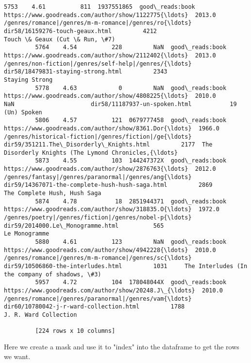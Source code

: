 \documentclass[11pt]{article}
\begin{document}
\begin{Verbatim}[commandchars=\\\{\}]
         5753    4.61          811  1937551865  good\_reads:book  https://www.goodreads.com/author/show/1122775{\ldots}  2013.0  /genres/romance|/genres/m-m-romance|/genres/ro{\ldots}                    dir58/16159276-touch-geaux.html         4212                      Touch \& Geaux (Cut \& Run, \#7)
         5764    4.54          228         NaN  good\_reads:book  https://www.goodreads.com/author/show/2112402{\ldots}  2013.0  /genres/non-fiction|/genres/self-help|/genres/{\ldots}                 dir58/18479831-staying-strong.html         2343                                     Staying Strong
         5778    4.63            0         NaN  good\_reads:book  https://www.goodreads.com/author/show/4808225{\ldots}  2010.0                                                NaN                      dir58/11187937-un-spoken.html           19                                        (Un) Spoken
         5806    4.57          121  0679777458  good\_reads:book  https://www.goodreads.com/author/show/8361.Dor{\ldots}  1966.0  /genres/historical-fiction|/genres/fiction|/ge{\ldots}           dir59/351211.The\_Disorderly\_Knights.html         2177  The Disorderly Knights (The Lymond Chronicles,{\ldots}
         5873    4.55          103  144247372X  good\_reads:book  https://www.goodreads.com/author/show/2876763{\ldots}  2012.0  /genres/fantasy|/genres/paranormal|/genres/ang{\ldots}    dir59/14367071-the-complete-hush-hush-saga.html         2869                       The Complete Hush, Hush Saga
         5874    4.78           18  2851944371  good\_reads:book  https://www.goodreads.com/author/show/318835.O{\ldots}  1972.0  /genres/poetry|/genres/fiction|/genres/nobel-p{\ldots}                   dir59/2014000.Le\_Monogramme.html          565                                      Le Monogramme
         5880    4.61          123         NaN  good\_reads:book  https://www.goodreads.com/author/show/4942228{\ldots}  2010.0  /genres/romance|/genres/m-m-romance|/genres/sc{\ldots}                 dir59/10506860-the-interludes.html         1031     The Interludes (In the company of shadows, \#3)
         5957    4.72          104  178048044X  good\_reads:book  https://www.goodreads.com/author/show/20248.J\_{\ldots}  2010.0  /genres/romance|/genres/paranormal|/genres/vam{\ldots}            dir60/10780042-j-r-ward-collection.html         1788                              J. R. Ward Collection
         
         [224 rows x 10 columns]
\end{Verbatim}
            
    Here we create a mask and use it to "index" into the dataframe to get
the rows we want.
\end{document}
